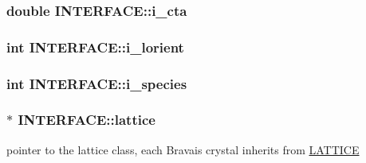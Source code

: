 \subsubsection[{i\+\_\+cta}]{\setlength{\rightskip}{0pt plus 5cm}double I\+N\+T\+E\+R\+F\+A\+C\+E\+::i\+\_\+cta\hspace{0.3cm}{\ttfamily [private]}}\label{class_i_n_t_e_r_f_a_c_e_a22d766838fbda33270ff5c2773b18022}
\hypertarget{class_i_n_t_e_r_f_a_c_e_a24698e299c30a479e6652e8a3ff1d805}{}
\subsubsection[{i\+\_\+lorient}]{\setlength{\rightskip}{0pt plus 5cm}int I\+N\+T\+E\+R\+F\+A\+C\+E\+::i\+\_\+lorient\hspace{0.3cm}{\ttfamily [private]}}\label{class_i_n_t_e_r_f_a_c_e_a24698e299c30a479e6652e8a3ff1d805}
\hypertarget{class_i_n_t_e_r_f_a_c_e_aa15d8db18b46f162fab82aaec313e898}{}
\subsubsection[{i\+\_\+species}]{\setlength{\rightskip}{0pt plus 5cm}int I\+N\+T\+E\+R\+F\+A\+C\+E\+::i\+\_\+species\hspace{0.3cm}{\ttfamily [private]}}\label{class_i_n_t_e_r_f_a_c_e_aa15d8db18b46f162fab82aaec313e898}
\hypertarget{class_i_n_t_e_r_f_a_c_e_a5e07ee2e9ab4f84a9a6ae25c023dc24b}{}
\subsubsection[{lattice}]{$\ast$ I\+N\+T\+E\+R\+F\+A\+C\+E\+::lattice}\label{class_i_n_t_e_r_f_a_c_e_a5e07ee2e9ab4f84a9a6ae25c023dc24b}


pointer to the lattice class, each Bravais crystal inherits from \hyperlink{class_l_a_t_t_i_c_e}{L\+A\+T\+T\+I\+C\+E} 

\hypertarget{class_i_n_t_e_r_f_a_c_e_a1019e8f33030b94977af9d53dd18b2a2}{}
